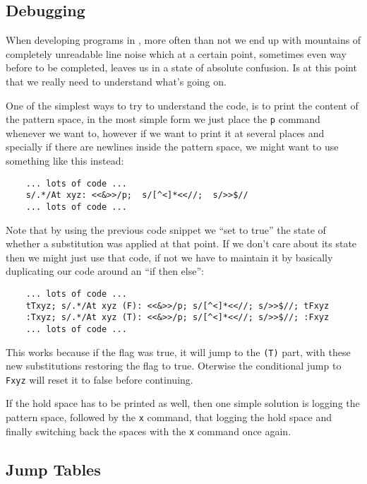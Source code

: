 \subsection{Debugging}

When developing programs in \sed, more often than not we end up with mountains
of completely unreadable line noise which at a certain point, sometimes even
way before to be completed, leaves us in a state of absolute confusion.  Is at
this point that we really need to understand what's going on.

One of the simplest ways to try to understand the code, is to print the content
of the pattern space, in the most simple form we just place the {\tt p} command
whenever we want to, however if we want to print it at several places and
specially if there are newlines inside the pattern space, we might want to use
something like this instead:

\begin{Verbatim}
	... lots of code ...
	s/.*/At xyz: <<&>>/p;  s/[^<]*<<//;  s/>>$//
	... lots of code ...
\end{Verbatim}

Note that by using the previous code snippet we ``set to true'' the state of
whether a substitution was applied at that point.  If we don't care about its
state then we might just use that code, if not we have to maintain it by
basically duplicating our code around an ``if then else'':

\begin{Verbatim}
	... lots of code ...
	tTxyz; s/.*/At xyz (F): <<&>>/p; s/[^<]*<<//; s/>>$//; tFxyz
	:Txyz; s/.*/At xyz (T): <<&>>/p; s/[^<]*<<//; s/>>$//; :Fxyz
	... lots of code ...
\end{Verbatim}

This works because if the flag was true, it will jump to the {\tt (T)} part,
with these new substitutions restoring the flag to true.
Oterwise the conditional jump to {\tt Fxyz} will reset it to false
before continuing.

If the hold space has to be printed as well, then one simple solution is
logging the pattern space, followed by the {\tt x} command, that logging
the hold space and finally switching back the spaces with the {\tt x}
command once again.


\subsection{Jump Tables}

